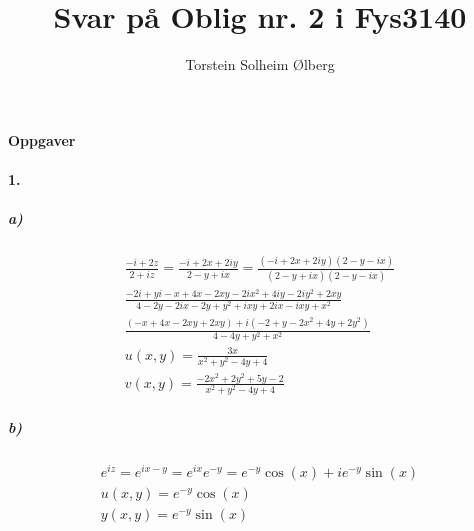 \documentclass[11pt, A4paper,norsk]{article}
\author{Torstein Solheim Ølberg}
\title{Svar på Oblig nr. 2 i Fys3140}
\begin{document}
\maketitle
	\begin{center}
\Large \textbf{Oppgaver}
	\end{center}









		\paragraph{1.}
			\subparagraph{a)}
				\begin{gather}
\frac{-i + 2z}{2 + iz} = \frac{-i + 2x + 2iy}{2 - y + ix} = \frac{(-i + 2x + 2iy)(2 - y - ix)}{(2 - y + ix)(2 - y - ix)} \\
\frac{-2i + yi - x + 4x - 2xy - 2ix^{2} + 4iy - 2iy^{2} + 2xy}{4 - 2y - 2ix - 2y + y^2 + ixy + 2ix - ixy + x^2} \\
\frac{(- x + 4x - 2xy + 2xy) + i(- 2 + y - 2x^2 + 4y + 2y^2)}{4 - 4y + y^2 + x^2} \\
u(x, y) = \frac{3x}{x^2 + y^2 - 4y + 4} \\
v(x, y) = \frac{- 2x^2 + 2y^2 + 5y - 2}{x^2 + y^2 - 4y + 4}
				\end{gather}









			\subparagraph{b)}
				\begin{gather}
e^{iz} = e^{ix - y} = e^{ix}e^{-y} = e^{-y}\cos(x) + ie^{-y}\sin(x) \\
u(x,y) = e^{-y}\cos(x) \\
y(x,y) = e^{-y}\sin(x)
				\end{gather}
\end{document}

